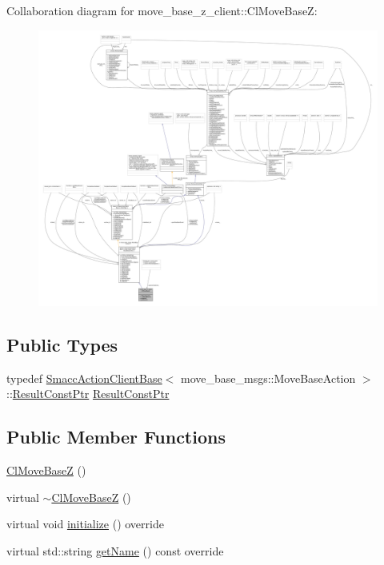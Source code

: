 Collaboration diagram for move\+\_\+base\+\_\+z\+\_\+client\+:\+:Cl\+Move\+BaseZ\+:
\nopagebreak
\begin{figure}[H]
\begin{center}
\leavevmode
\includegraphics[width=350pt]{classmove__base__z__client_1_1ClMoveBaseZ__coll__graph}
\end{center}
\end{figure}
\subsection*{Public Types}
\begin{DoxyCompactItemize}
\item 
typedef \hyperlink{classsmacc_1_1SmaccActionClientBase_a55625fdfd8344a88919aa6fa935b66fe}{Smacc\+Action\+Client\+Base}$<$ move\+\_\+base\+\_\+msgs\+::\+Move\+Base\+Action $>$\+::\hyperlink{classmove__base__z__client_1_1ClMoveBaseZ_a3b774d99d3dd4526f99b968d65ef5834}{Result\+Const\+Ptr} \hyperlink{classmove__base__z__client_1_1ClMoveBaseZ_a3b774d99d3dd4526f99b968d65ef5834}{Result\+Const\+Ptr}
\end{DoxyCompactItemize}
\subsection*{Public Member Functions}
\begin{DoxyCompactItemize}
\item 
\hyperlink{classmove__base__z__client_1_1ClMoveBaseZ_a98f9aec59e243cd7e464c0ae6b03ed2a}{Cl\+Move\+BaseZ} ()
\item 
virtual \hyperlink{classmove__base__z__client_1_1ClMoveBaseZ_ab5de84b969e58d80723f5c0d3ce79afa}{$\sim$\+Cl\+Move\+BaseZ} ()
\item 
virtual void \hyperlink{classmove__base__z__client_1_1ClMoveBaseZ_a082cef8bf5dbd0ec06adfe2a7aefbf70}{initialize} () override
\item 
virtual std\+::string \hyperlink{classmove__base__z__client_1_1ClMoveBaseZ_aa7446f57e3740d89c71ba12f1f3c00c0}{get\+Name} () const override
\end{DoxyCompactItemize}
